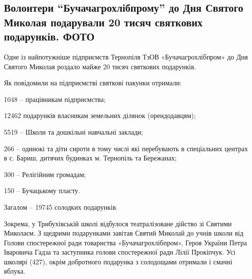  
 
 
 
 
\subsection{Волонтери \enquote{Бучачагрохлібпрому} до Дня Святого Миколая подарували 20 тисяч святкових подарунків. ФОТО}
\label{sec:https://zz.te.ua/volontery-buchachahrokhlibpromu-do-dnia-sviatoho-mykolaia-podaruvaly-20-tysiach-sviatkovykh-podarunkiv-foto}


Одне із найпотужніше підприємств Тернопіля ТзОВ «Бучачагрохлібпром» до Дня
Святого Миколая роздало майже 20 тисяч святкових подарунків.


Як повідомили на підприємстві святкові пакунки отримали:

1048 – працівникам підприємства;

12462 подарунків власникам земельних ділянок (орендодавцям);

5519 – Школи та дошкільні навчальні заклади;

266 – одинокі та діти сироти в тому числі які перебувають в спеціальних центрах
в с. Бариш, дитячих будинках м. Тернопіль та Бережанах;

300 – Релігійним громадам;

150 – Бучацькому пласту.

Загалом – 19745 солодких подарунків.


Зокрема, у Трибухівській школі відбулося театралізоване дійство зі Святими
Миколаєм. З щедрими подарунками завітав Святий Миколай до учнів школи від
Голови спостережної ради товариства «Бучачагрохлібпром», Героя України Петра
Іваровича Гадза та заступника голови спостережної ради Лілії Прокіпчук. Усі
школярі (427), окрім добротного подарунка з солодощами отримали і смачні
яблука.

